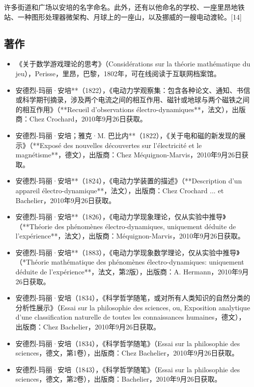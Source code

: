 许多街道和广场以安培的名字命名。此外，还有以他命名的学校、一座里昂地铁站、一种图形处理器微架构、月球上的一座山，以及挪威的一艘电动渡轮。[14]
\subsection{著作}

\begin{itemize}
\item 《关于数学游戏理论的思考》（Considérations sur la théorie mathématique du jeu），Perisse，里昂，巴黎，1802年，可在线阅读于互联网档案馆。
\item 安德烈-玛丽·安培**（1822），《电动力学观察集：包含各种论文、通知、书信或科学期刊摘录，涉及两个电流之间的相互作用、磁针或地球与两个磁铁之间的相互作用》（**Recueil d'observations électro-dynamiques**，法文），出版商：Chez Crochard，2010年9月26日获取。
\item 安德烈-玛丽·安培；雅克·M. 巴比内**（1822），《关于电和磁的新发现的展示》（**Exposé des nouvelles découvertes sur l'électricité et le magnétisme**，德文），出版商：Chez Méquignon-Marvis，2010年9月26日获取。
\item 安德烈-玛丽·安培**（1824），《电动力学装置的描述》（**Description d'un appareil électro-dynamique**，法文），出版商：Chez Crochard ... et Bachelier，2010年9月26日获取。
\item 安德烈-玛丽·安培**（1826），《电动力学现象理论，仅从实验中推导》（**Théorie des phénomènes électro-dynamiques, uniquement déduite de l'expérience**，法文），出版商：Méquignon-Marvis，2010年9月26日获取。
   \item 安德烈-玛丽·安培**（1883），《电动力学现象数学理论，仅从实验中推导》（*Théorie mathématique des phénomènes électro-dynamiques: uniquement déduite de l'expérience**，法文，第2版），出版商：A. Hermann，2010年9月26日获取。

\item 安德烈-玛丽·安培（1834），《科学哲学随笔，或对所有人类知识的自然分类的分析性展示》（Essai sur la philosophie des sciences, ou, Exposition analytique d'une classification naturelle de toutes les connaissances humaines，德文），出版商：Chez Bachelier，2010年9月26日获取。
  \item 安德烈-玛丽·安培（1834），《科学哲学随笔》（Essai sur la philosophie des sciences，德文，第1卷），出版商：Chez Bachelier，2010年9月26日获取。
   \item 安德烈-玛丽·安培（1843），《科学哲学随笔》（Essai sur la philosophie des sciences，德文，第2卷），出版商：Bachelier，2010年9月26日获取。
\end{itemize}